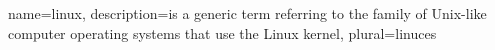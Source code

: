 {
	name=linux,
	description={is a generic term referring to the family of Unix-like
		computer operating systems that use the Linux kernel},
	plural=linuces
}

